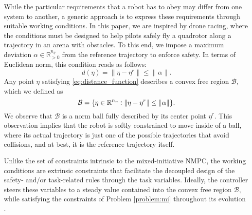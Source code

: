 While the particular requirements that a robot has to obey may differ from one system to another, a generic approach is to express these requirements through suitable working conditions. In this paper, we are inspired by drone racing, where the conditions must be designed to help pilots safely fly a quadrotor along a trajectory in an arena with obstacles. To this end, we impose a maximum deviation $\alpha \in \mathbb{R}^{n_\eta}_{>0}$ from the reference trajectory to enforce safety. In terms of Euclidean norm, this condition reads as follows:
\begin{equation}
	d(\eta) = \|\eta-\eta^r\| \leq \|\alpha\|. \label{eq:distance_function}
\end{equation}
Any point $\eta$ satisfying \eqref{eq:distance_function} describes a convex free region $\mathcal{B}$, which we defined as
\begin{equation}
	\mathcal{B} = \{\eta \in \mathbb{R}^{n_\eta} \vcentcolon \|\eta-\eta^r\| \leq \|\alpha\| \}.
\end{equation}
We observe that $\mathcal{B}$ is a norm ball fully described by its center point $\eta^r$. This observation implies that the robot is softly constrained to move inside of a ball, where its actual trajectory is just one of the possible trajectories that avoid collisions, and at best, it is the reference trajectory itself. 

Unlike the set of constraints intrinsic to the mixed-initiative NMPC, the working conditions are extrinsic constraints that facilitate the decoupled design of the safety- and/or task-related rules through the task variables. Ideally, the controller steers these variables to a steady value contained into the convex free region $\mathcal{B}$, while satisfying the constraints of Problem \ref{problem:mi} throughout its evolution \cite{camacho2010}. 
